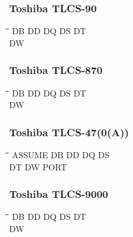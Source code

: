 \subsubsection{Toshiba TLCS-90}
{\tt\begin{tabbing}
\hspace{3cm}\=\hspace{3cm}\=\hspace{3cm}\=\hspace{3cm}\=\kill
DB         \> DD          \> DQ          \> DS          \> DT \\
DW \\
\end{tabbing}}

\subsubsection{Toshiba TLCS-870}
{\tt\begin{tabbing}
\hspace{3cm}\=\hspace{3cm}\=\hspace{3cm}\=\hspace{3cm}\=\kill
DB         \> DD          \> DQ          \> DS          \> DT \\
DW \\
\end{tabbing}}

\subsubsection{Toshiba TLCS-47(0(A))}
{\tt\begin{tabbing}
\hspace{3cm}\=\hspace{3cm}\=\hspace{3cm}\=\hspace{3cm}\=\kill
ASSUME     \> DB          \> DD          \> DQ          \> DS \\
DT         \> DW          \> PORT \\
\end{tabbing}}

\subsubsection{Toshiba TLCS-9000}
{\tt\begin{tabbing}
\hspace{3cm}\=\hspace{3cm}\=\hspace{3cm}\=\hspace{3cm}\=\kill
DB         \> DD          \> DQ          \> DS          \> DT \\
DW \\
\end{tabbing}}

